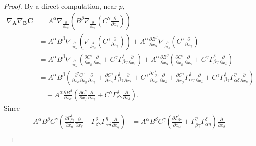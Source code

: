 \documentclass[11pt]{amsart}
\newcommand{\A}{\mathbf{A}}
\newcommand{\B}{\mathbf{B}}
\newcommand{\C}{\mathbf{C}}
\theoremstyle{definition}
\theoremstyle{remark}
\numberwithin{equation}{section}
\begin{document}
\begin{proof}
    By a direct computation, near $p$,
    \begin{equation*}
    \begin{split}
       \nabla_{\A}\nabla_{\B} \C&=A^\alpha\nabla_{\frac{\partial}{\partial x_\alpha}}\left(B^\beta\nabla_{\frac{\partial}{\partial x_\beta}} \left(C^\gamma\frac{\partial}{\partial x_\gamma}\right)\right)\\
        &=A^\alpha B^\beta\nabla_{\frac{\partial}{\partial x_\alpha}}\left(\nabla_{\frac{\partial}{\partial x_\beta}} \left(C^\gamma\frac{\partial}{\partial x_\gamma}\right)\right)+A^\alpha\frac{\partial B^\beta}{\partial x_\alpha}\nabla_{\frac{\partial}{\partial x_\beta}} \left(C^\gamma\frac{\partial}{\partial x_\gamma}\right)\\
        &=A^\alpha B^\beta \nabla_{\frac{\partial}{\partial x_\alpha}}\left(\frac{\partial C^\gamma}{\partial x_\beta} \frac{\partial}{\partial x_\gamma}+C^\gamma\Gamma_{\beta\gamma}^\delta \frac{\partial}{\partial x_\delta}\right)+A^\alpha\frac{\partial B^\beta}{\partial x_\alpha}\left(\frac{\partial C^\gamma}{\partial x_\beta}\frac{\partial}{\partial x_\gamma}+C^\gamma\Gamma_{\beta\gamma}^\delta\frac{\partial}{\partial x_\delta}\right)\\
        &=A^\alpha B^\beta\left(\frac{\partial^2 C^\gamma}{\partial x_\alpha\partial x_\beta}\frac{\partial}{\partial x_\gamma}+\frac{\partial C^\gamma}{\partial x_\alpha}\Gamma_{\beta\gamma}^\delta\frac{\partial}{\partial x_\delta}+C^\gamma\frac{\partial \Gamma_{\beta\gamma}^\delta}{\partial x_\alpha}\frac{\partial}{\partial x_\delta}+\frac{\partial C^\gamma}{\partial x_\beta}\Gamma_{\alpha\gamma}^\delta\frac{\partial}{\partial x_\delta}+C^\gamma\Gamma_{\beta\gamma}^\delta\Gamma_{\alpha\delta}^\eta\frac{\partial}{\partial x_\eta}\right)\\
        &\quad+A^\alpha\frac{\partial B^\beta}{\partial x_\alpha}\left(\frac{\partial C^\gamma}{\partial x_\beta}\frac{\partial}{\partial x_\gamma}+C^\gamma\Gamma_{\beta\gamma}^\delta\frac{\partial}{\partial x_\delta}\right).
    \end{split}
\end{equation*}
Since
\begin{equation*}
\begin{split}
     A^\alpha B^\beta C^\gamma\left(\frac{\partial\Gamma_{\beta\gamma}^\delta}{\partial x_\alpha}\frac{\partial}{\partial x_\delta}+\Gamma_{\beta\gamma}^\delta\Gamma_{\alpha\delta}^\eta\frac{\partial}{\partial x_\eta}\right)&= A^\alpha B^\beta C^\gamma\left(\frac{\partial\Gamma_{\beta\gamma}^\delta}{\partial x_\alpha}+\Gamma_{\beta\gamma}^\eta\Gamma_{\alpha\eta}^\delta\right)\frac{\partial}{\partial x_\delta}\\

\end{split}
\end{equation*}
\end{proof}
\end{document}

